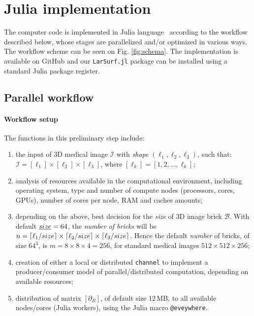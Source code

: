 
\section{Julia implementation}\label{sec:julia}

The computer code is implemented in Julia language~\cite{BEKS14} according to the workflow described below, whose stages are parallelized and/or optimized in various ways. The workflow scheme can be seen on Fig. \ref{fig:schema}. The implementation is available on GitHub \cite{larsurf-github} and our \texttt{LarSurf.jl} package can be installed using a standard Julia package register.

\subsection{Parallel workflow}\label{sec:implementation}


\paragraph{Workflow setup}\label{sec:workflow}
The functions in this preliminary step include:
\begin{enumerate}

\item the input of 3D medical image $\mathcal{I}$ with \emph{shape} $(\ell_1, \ell_2, \ell_3)$, such that: $\mathcal{I} = [\ell_1]\times[\ell_2]\times[\ell_3]$, where $[\ell_k] = [1,2,\ldots,\ell_k]$;

\item analysis of resources available in the computational environment, including operating system, type and number of compute nodes (processors, cores, GPUs), number of cores per node, RAM and caches amounts;

\item depending on the above, best decision for the \emph{size} of 3D image brick $\mathcal{B}$. With default $\emph{size}=64$,  the \emph{number of bricks} will be $n=\left\lceil \ell_1/size \right\rceil\times\left\lceil \ell_2/size \right\rceil\times\left\lceil \ell_3/size \right\rceil$. 
Hence the default \emph{number} of bricks, of size $64^3$, is $m=8\times 8\times 4 = 256$, for standard medical images $512\times 512\times 256$;


\item creation of either a local or distributed \texttt{channel} to implement a producer/consumer model of parallel/distributed computation, depending on available resources;

\item distribution of matrix $[\partial_B]$, of default size 12\,MB, to all available nodes/cores (Julia workers), using the Julia macro \texttt{@eveywhere}. 

\end{enumerate}

